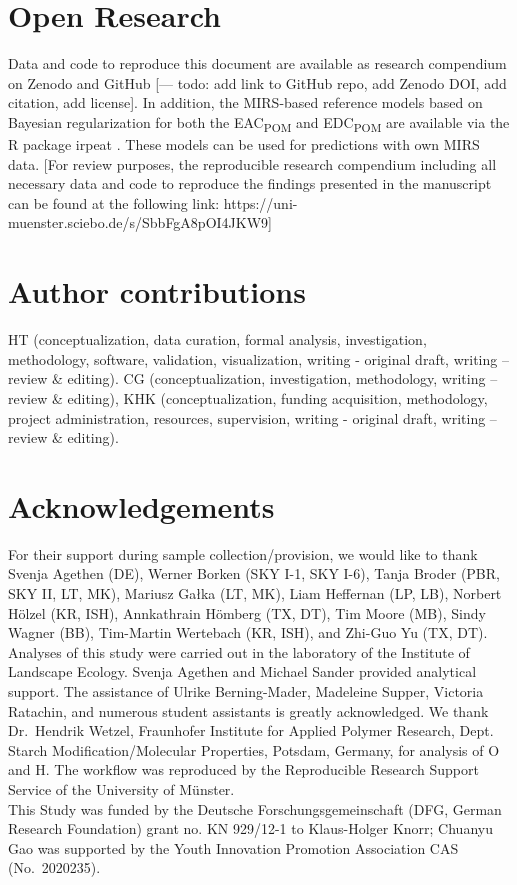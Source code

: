 \documentclass[draft,linenumbers]{agujournal2018}
\begin{document}
\section*{Open Research}

Data and code to reproduce this document are available as research
compendium on Zenodo and GitHub {[}--- todo: add link to GitHub repo,
add Zenodo DOI, add citation, add license{]}. In addition, the
MIRS-based reference models based on Bayesian regularization for both
the EAC\textsubscript{POM} and EDC\textsubscript{POM} are available via
the R package irpeat \citep{Teickner.2020b}. These models can be used
for predictions with own MIRS data. {[}For review purposes, the
reproducible research compendium including all necessary data and code
to reproduce the findings presented in the manuscript can be found at
the following link: https://uni-muenster.sciebo.de/s/SbbFgA8pOI4JKW9{]}

\section*{Author contributions}

HT (conceptualization, data curation, formal analysis, investigation,
methodology, software, validation, visualization, writing - original
draft, writing -- review \& editing). CG (conceptualization,
investigation, methodology, writing -- review \& editing), KHK
(conceptualization, funding acquisition, methodology, project
administration, resources, supervision, writing - original draft,
writing -- review \& editing).

\section*{Acknowledgements}

For their support during sample collection/provision, we would like to
thank Svenja Agethen (DE), Werner Borken (SKY I-1, SKY I-6), Tanja
Broder (PBR, SKY II, LT, MK), Mariusz Gałka (LT, MK), Liam Heffernan
(LP, LB), Norbert Hölzel (KR, ISH), Annkathrain Hömberg (TX, DT), Tim
Moore (MB), Sindy Wagner (BB), Tim-Martin Wertebach (KR, ISH), and
Zhi-Guo Yu (TX, DT).\\
Analyses of this study were carried out in the laboratory of the
Institute of Landscape Ecology. Svenja Agethen and Michael Sander
provided analytical support. The assistance of Ulrike Berning-Mader,
Madeleine Supper, Victoria Ratachin, and numerous student assistants is
greatly acknowledged. We thank Dr.~Hendrik Wetzel, Fraunhofer Institute
for Applied Polymer Research, Dept. Starch Modification/Molecular
Properties, Potsdam, Germany, for analysis of O and H. The workflow was
reproduced by the Reproducible Research Support Service of the
University of Münster.\\
This Study was funded by the Deutsche Forschungsgemeinschaft (DFG,
German Research Foundation) grant no. KN 929/12-1 to Klaus-Holger Knorr;
Chuanyu Gao was supported by the Youth Innovation Promotion Association
CAS (No.~2020235).
\end{document}
